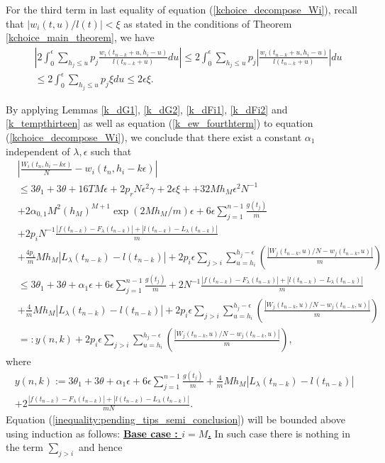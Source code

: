 \documentclass[12pt]{article}
\numberwithin{equation}{section}  %
\begin{document}
For the third term in last equality of equation (\ref{kchoice_decompose_Wi}), recall that $|w_i(t,u)/l(t)|<\xi$ as stated in the conditions of Theorem \ref{kchoice_main_theorem}, we have
\begin{align}
& \left|
2\int_{0}^{\epsilon} \sum_{h_j\leq u} p_j\frac{w_i(t_{n-k}+u,h_i-u)}{l(t_{n-k}+u)}du
\right|\leq 
2 \int_{0}^{\epsilon} \sum_{h_j\leq u} p_j \left|
\frac{w_i(t_{n-k}+u,h_i-u)}{l(t_{n-k}+u)}
\right|du\nonumber\\
&\leq 2\int_{0}^{\epsilon} \sum_{h_j\leq u} p_j \xi du\leq 2\epsilon \xi \label{k_ew_fourthterm}.
\end{align} 

By applying Lemmas \ref{k_dG1}, \ref{k_dG2}, \ref{k_dFi1}, \ref{k_dFi2} and \ref{k_tempthirteen} as well as equation (\ref{k_ew_fourthterm}) to equation (\ref{kchoice_decompose_Wi}), we conclude that there exist a constant $\alpha_1$ independent of $\lambda,\epsilon$ such that
\begin{align} 
&\left|
\frac{W_i(t_n,h_i-k\epsilon)}{N}-w_i(t_n,h_i-k\epsilon)
\right|\nonumber\\
&\leq 3\theta_1+3\theta +16 T M \epsilon+2p_r N \epsilon^2 \gamma +2\epsilon \xi+ +32Mh_M\epsilon^{2}N^{-1}\nonumber\\
&+2\alpha_{0,1}M^2(h_M)^{M+1}\exp(2Mh_M/m)\epsilon +6\epsilon\sum_{j=1}^{n-1} \frac{g(t_{j})}{m}\nonumber\\
&+2p_i  N^{-1} \frac{|f(t_{n-k})-F_\lambda(t_{n-k})|+  |l(t_{n-k})-L_\lambda(t_{n-k})|}{m}
\nonumber\\
&+\frac{4p_i}{m}Mh_M|L_{\lambda}(t_{n-k})-l(t_{n-k})|+2p_i\epsilon  \sum_{j>i} \sum_{u=h_i}^{h_j-\epsilon} 
\left(
\frac{ |W_j(t_{n-k},u)/N- w_j(t_{n-k},u)|}{m}
\right)\nonumber\\
&\leq3\theta_1+3\theta+\alpha_1\epsilon+6\epsilon\sum_{j=1}^{n-1} \frac{g(t_{j})}{m} 
+2  N^{-1} \frac{|f(t_{n-k})-F_\lambda(t_{n-k})|+  |l(t_{n-k})-L_\lambda(t_{n-k})|}{m}\nonumber\\
&+\frac{4}{m}Mh_M|L_{\lambda}(t_{n-k})-l(t_{n-k})|
+2p_i\epsilon  \sum_{j>i} \sum_{u=h_i}^{h_j-\epsilon} 
\left(
\frac{ |W_j(t_{n-k},u)/N- w_j(t_{n-k},u)|}{m}
\right)\nonumber\\
&=:y(n,k)+2p_i\epsilon  \sum_{j>i} \sum_{u=h_i}^{h_j-\epsilon} 
\left(
\frac{ |W_j(t_{n-k},u)/N- w_j(t_{n-k},u)|}{m}
\right) \label{inequality:pending_tips_semi_conclusion},
\end{align} 
where
\begin{align} 
y(n,k):=3\theta_1+3\theta+\alpha_1\epsilon+6\epsilon\sum_{j=1}^{n-1} \frac{g(t_{j})}{m} +\frac{4}{m}Mh_M|L_{\lambda}(t_{n-k})-l(t_{n-k})|\nonumber\\
+2   \frac{|f(t_{n-k})-F_\lambda(t_{n-k})|+  |l(t_{n-k})-L_\lambda(t_{n-k})|}{mN}.\label{y_n_and_k}
\end{align}
Equation (\ref{inequality:pending_tips_semi_conclusion}) will be bounded above using induction as follows: 
\underline{\textbf{Base case : $i=M$.}} In such case there is nothing in the term $\sum_{j>i}$
and hence 
\end{document}
